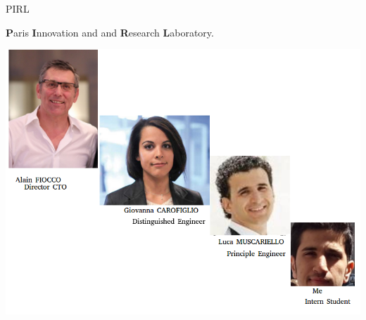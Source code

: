 \documentclass[8pt]{beamer}
\newcommand{\1}{\mathbbm 1}
\begin{document}
\begin{frame}{PIRL}

\textbf{P}aris \textbf{I}nnovation and and \textbf{R}esearch \textbf{L}aboratory.

\begin{center}
\includegraphics[scale=0.22]{figures/photos.png}
\end{center}



\end{frame}




\end{document}
